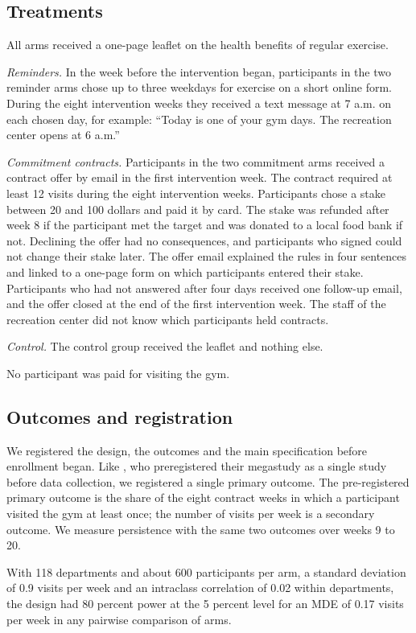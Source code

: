 \subsection{Treatments}
All arms received a one-page leaflet on the health benefits of regular exercise.

\emph{Reminders.} In the week before the intervention began, participants in the two reminder arms chose up to three weekdays for exercise on a short online form. During the eight intervention weeks they received a text message at 7 a.m. on each chosen day, for example: ``Today is one of your gym days. The recreation center opens at 6 a.m.''

\emph{Commitment contracts.} Participants in the two commitment arms received a contract offer by email in the first intervention week. The contract required at least 12 visits during the eight intervention weeks. Participants chose a stake between 20 and 100 dollars and paid it by card. The stake was refunded after week 8 if the participant met the target and was donated to a local food bank if not. Declining the offer had no consequences, and participants who signed could not change their stake later. The offer email explained the rules in four sentences and linked to a one-page form on which participants entered their stake. Participants who had not answered after four days received one follow-up email, and the offer closed at the end of the first intervention week. The staff of the recreation center did not know which participants held contracts.

\emph{Control.} The control group received the leaflet and nothing else.

No participant was paid for visiting the gym.

\subsection{Outcomes and registration}
We registered the design, the outcomes and the main specification before enrollment began. Like \citet{milkman2021}, who preregistered their megastudy as a single study before data collection, we registered a single primary outcome. The pre-registered primary outcome is the share of the eight contract weeks in which a participant visited the gym at least once; the number of visits per week is a secondary outcome. We measure persistence with the same two outcomes over weeks 9 to 20.

With 118 departments and about 600 participants per arm, a standard deviation of 0.9 visits per week and an intraclass correlation of 0.02 within departments, the design had 80 percent power at the 5 percent level for an MDE of 0.17 visits per week in any pairwise comparison of arms.

